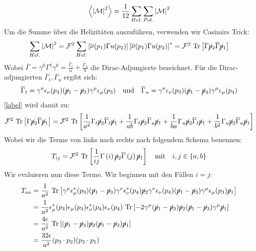 \begin{equation}
	\left\langle  \abs{\mathcal{M}}^2\right\rangle = \frac{1}{12} \sum_{Hel.} \sum_{Pol.} \abs{\mathcal{M}}^2
\end{equation}
Um die Summe über die Helizitäten auszuführen, verwenden wir Casimirs Trick:
\begin{equation}
	\sum_{Hel.} \abs{\mathcal{M}}^2 = \mathcal{F}^2 \sum_{Hel.}  \left[ \overline{\nu}(p_1) \Gamma u(p_2)\right] \left[\overline{\nu}(p_1) \Gamma u(p_2)\right]^* = \mathcal{F}^2~\text{Tr}\left[ \Gamma \cancel{p}_2 \overline{\Gamma} \cancel{p}_1 \right]
\end{equation}
Wobei $\overline{\Gamma} = \gamma^0\Gamma^\dagger\gamma^0 = \frac{\overline{\Gamma}_t}{a} + \frac{\overline{\Gamma}_u}{b}$ die Dirac-Adjungierte bezeichnet. Für die Dirac-adjungierten $\overline{\Gamma}_t, \overline{\Gamma}_u$ ergibt sich:
\begin{equation}
			\overline{\Gamma}_t = \gamma^\nu \epsilon_\nu(p_4) (\cancel{p}_1- \cancel{p}_3)  \gamma^\mu \epsilon_\mu(p_3) \quad \text{und} \quad \overline{\Gamma}_u = \gamma^\nu \epsilon_\nu(p_3) (\cancel{p}_1- \cancel{p}_4)  \gamma^\mu \epsilon_\mu(p_4)
\end{equation}
\autoref{label} wird damit zu:
\begin{equation}
	\mathcal{F}^2~\text{Tr}\left[ \Gamma \cancel{p}_2 \overline{\Gamma} \cancel{p}_1 \right] = \mathcal{F}^2~\text{Tr}\left[\frac{1}{a^2} \Gamma_t \cancel{p}_2 \overline{\Gamma}_t \cancel{p}_1 + \frac{1}{ab} \Gamma_t \cancel{p}_2 \overline{\Gamma}_u \cancel{p}_1 + \frac{1}{ba} \Gamma_u \cancel{p}_2 \overline{\Gamma}_t \cancel{p}_1 + \frac{1}{b^2} \Gamma_u \cancel{p}_2 \overline{\Gamma}_u \cancel{p}_1\right]
\end{equation}
Wobei wir die Terme von links nach rechts nach folgendem Schema benennen:
\begin{equation}
	T_{ij} = \mathcal{F}^2~\text{Tr}\left[ \frac{1}{ij} \Gamma\left(i\right) \cancel{p}_2 \overline{\Gamma}\left(j\right) \cancel{p}_1 \right] \quad \text{mit} \quad i,j \in \left\lbrace a,b\right\rbrace
\end{equation}
Wir evaluieren nun diese Terme. Wir beginnen mit den Fällen $i = j$:
\begin{equation}
	\begin{aligned}
	T_{aa} &= \frac{1}{a^2}~\text{Tr}\left[ \gamma^\mu \epsilon^*_\mu(p_3) (\cancel{p}_1- \cancel{p}_3)  \gamma^\nu \epsilon_\nu^*(p_4) \cancel{p}_2 \gamma^\nu \epsilon_\nu(p_4) (\cancel{p}_1- \cancel{p}_3)  \gamma^\mu \epsilon_\mu(p_3) \cancel{p}_1 \right] \\
	&=\frac{1}{a^2} \epsilon^*_\mu(p_3)\epsilon_\mu(p_3)\epsilon_\nu^*(p_4)\epsilon_\nu(p_4) ~\text{Tr}\left[-2\gamma^\mu(\cancel{p}_1- \cancel{p}_3) \cancel{p}_2 (\cancel{p}_1- \cancel{p}_3)\gamma^\mu \cancel{p}_1\right] \\
	&=\frac{4\epsilon}{a^2}~\text{Tr}\left[(\cancel{p}_1- \cancel{p}_3) \cancel{p}_2 (\cancel{p}_1- \cancel{p}_3)\cancel{p}_1\right] \\
	&=\frac{32\epsilon}{a^2}(p_3\cdot p_2)(p_3\cdot p_1)
	\end{aligned}
\end{equation}
